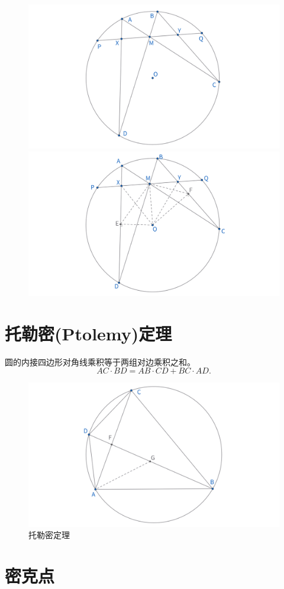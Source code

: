 \begin{figure}[H]
    \centering
    \hfill %
    \begin{minipage}[t]{0.45\textwidth}
    \centering
    \includegraphics[width=\linewidth]{figures/蝴蝶定理.png}
    \end{minipage}
    \hfill %
    \begin{minipage}[t]{0.45\textwidth}
    \centering
    \includegraphics[width=\linewidth]{figures/蝴蝶定理辅助线.png}
    \end{minipage}
\end{figure}



\section{托勒密(Ptolemy)定理}
\begin{theorem}
    圆的内接四边形对角线乘积等于两组对边乘积之和。
    $$AC \cdot BD = AB \cdot CD + BC \cdot AD.$$
\end{theorem}
\begin{figure}[H]
    \centering
    \includegraphics[width=0.7\linewidth]{figures/托勒密定理.png}
    \caption{托勒密定理}
\end{figure}


\section{密克点} 